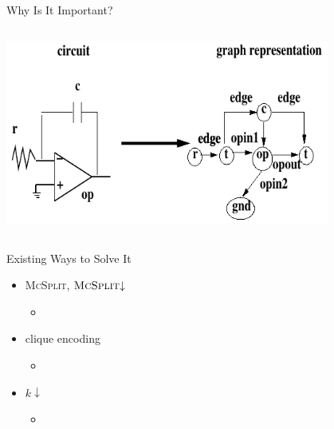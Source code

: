 \documentclass{beamer}
\begin{document}
\begin{frame}{Why Is It Important?}
\begin{columns}[t]
\begin{column}{0.5\textwidth}
      \includegraphics[width=0.8\textwidth]{electronics2.png}
    \end{column}
  \end{columns}
\end{frame}

\begin{frame}{Existing Ways to Solve It}
  \begin{itemize}
  \item \textsc{McSplit}, $\textsc{McSplit}{\downarrow}$
    \begin{itemize}
    \item \cite{DBLP:conf/ijcai/McCreeshPT17}
    \end{itemize}
  \item clique encoding
    \begin{itemize}
    \item \cite{DBLP:conf/cp/McCreeshNPS16}
    \end{itemize}
  \item $k{\downarrow}$
    \begin{itemize}
    \item \cite{DBLP:conf/aaai/HoffmannMR17}
    \end{itemize}
  \end{itemize}
\end{frame}
\end{document}
